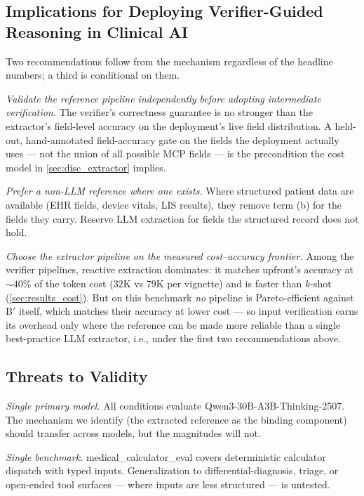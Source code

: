 \subsection{Implications for Deploying Verifier-Guided Reasoning in Clinical AI}
\label{sec:disc_implications}

Two recommendations follow from the mechanism regardless of the
headline numbers; a third is conditional on them.

\textit{Validate the reference pipeline independently before adopting
intermediate verification.} The verifier's correctness guarantee is no
stronger than the extractor's field-level accuracy on the deployment's
live field distribution. A held-out, hand-annotated field-accuracy
gate on the fields the deployment actually uses --- not the union of
all possible MCP fields --- is the precondition the cost model in
\cref{sec:disc_extractor} implies.

\textit{Prefer a non-LLM reference where one exists.} Where structured
patient data are available (EHR fields, device vitals, LIS results),
they remove term (b) for the fields they carry. Reserve LLM extraction
for fields the structured record does not hold.

\textit{Choose the extractor pipeline on the measured cost--accuracy
frontier.} Among the verifier pipelines, reactive extraction dominates:
it matches upfront's accuracy at $\sim$$40\%$ of the token cost
($32$K vs $79$K per vignette) and is faster than $k$-shot
(\cref{sec:results_cost}). But on this benchmark \emph{no} pipeline is
Pareto-efficient against B$'$ itself, which matches their accuracy at
lower cost --- so input verification earns its overhead only where the
reference can be made more reliable than a single best-practice LLM
extractor, i.e., under the first two recommendations above.

\subsection{Threats to Validity}
\label{sec:disc_limitations}

\textit{Single primary model.} All conditions evaluate
Qwen3-30B-A3B-Thinking-2507. The mechanism we identify (the extracted
reference as the binding component) should transfer across models, but
the magnitudes will not.

\textit{Single benchmark.} medical\_calculator\_eval covers
deterministic calculator dispatch with typed inputs. Generalization to
differential-diagnosis, triage, or open-ended tool surfaces --- where
inputs are less structured --- is untested.


